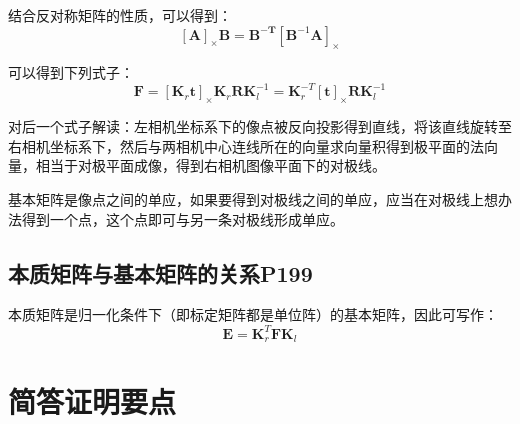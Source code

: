 \documentclass[11pt]{article}
\begin{document}
结合反对称矩阵的性质，可以得到：
\begin{equation*}
  \mathbold{[A]_\times B}=\mathbold{B^{-T}}\mathbf{[B^\mathrm{-1}A]_\times}
\end{equation*}\par
可以得到下列式子：
\begin{equation*}
  \mathbold{F}=[\mathbf{K}_r\mathbf{t}]_\times\mathbf{K}_r\mathbf{R}\mathbf{K}_l^{-1}=\mathbf{K}_r^{-T}[\mathbf{t}]_\times\mathbf{R}\mathbf{K}_l^{-1}
\end{equation*}\par
对后一个式子解读：左相机坐标系下的像点被反向投影得到直线，将该直线旋转至右相机坐标系下，然后与两相机中心连线所在的向量求向量积得到极平面的法向量，相当于对极平面成像，得到右相机图像平面下的对极线。\par
基本矩阵是像点之间的单应，如果要得到对极线之间的单应，应当在对极线上想办法得到一个点，这个点即可与另一条对极线形成单应。
\subsection{本质矩阵与基本矩阵的关系P199}
本质矩阵是归一化条件下（即标定矩阵都是单位阵）的基本矩阵，因此可写作：
\begin{equation*}
  \mathbold{E}=\mathbold{K}^T_r\mathbold{FK}_l
\end{equation*}\par

\section{简答证明要点}
\end{document}
